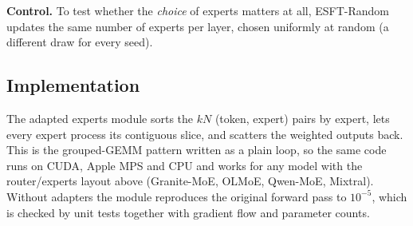 \textbf{Control.} To test whether the \emph{choice} of experts matters at all, ESFT-Random
updates the same number of experts per layer, chosen uniformly at random (a different draw for
every seed).

\subsection{Implementation}
The adapted experts module sorts the $kN$ (token, expert) pairs by expert, lets every expert
process its contiguous slice, and scatters the weighted outputs back. This is the grouped-GEMM
pattern written as a plain loop, so the same code runs on CUDA, Apple MPS and CPU and works for
any model with the router/experts layout above (Granite-MoE, OLMoE, Qwen-MoE, Mixtral).
Without adapters the module reproduces the original forward pass to $10^{-5}$, which is
checked by unit tests together with gradient flow and parameter counts.
